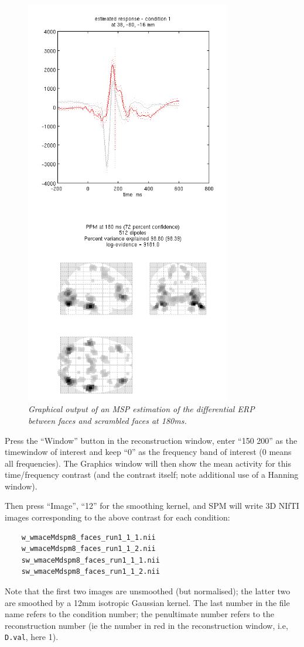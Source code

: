 \begin{figure}
\begin{center}
\includegraphics[width=90mm]{multimodal/figures/eeg_msp.png}
\caption{\em Graphical output of an MSP estimation of the differential ERP between faces and scrambled faces at 180ms. \label{multimodal:fig:9}}
\end{center}
\end{figure}

Press the ``Window'' button in the reconstruction window, enter ``150 200'' as the timewindow of interest and keep ``0'' as the frequency band of interest (0 means all frequencies). The Graphics window will then show the mean activity for this time/frequency contrast (and the contrast itself; note additional use of a Hanning window).

Then press ``Image'', ``12'' for the smoothing kernel, and SPM will write 3D NIfTI images corresponding to the above contrast for each condition:
\begin{verbatim}
    w_wmaceMdspm8_faces_run1_1_1.nii
    w_wmaceMdspm8_faces_run1_1_2.nii
    sw_wmaceMdspm8_faces_run1_1_1.nii
    sw_wmaceMdspm8_faces_run1_1_2.nii
\end{verbatim}
Note that the first two images are unsmoothed (but normalised); the latter two are smoothed by a 12mm isotropic Gaussian kernel. The last number in the file name refers to the condition number; the penultimate number refers to the reconstruction number (ie the number in red in the reconstruction window, i.e, \texttt{D.val}, here 1).

